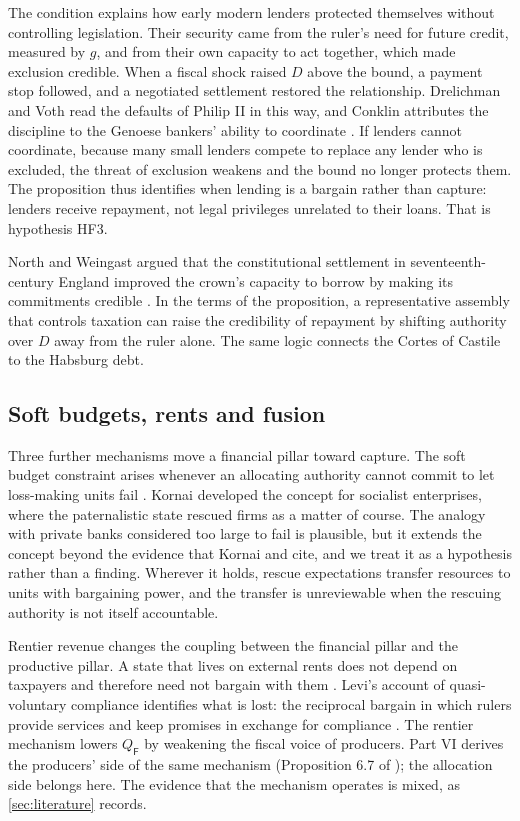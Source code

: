 \documentclass[11pt,letterpaper]{article}
\theoremstyle{definition}
\theoremstyle{remark}
\newcommand{\pF}{\mathsf{F}}
\begin{document}
The condition explains how early modern lenders protected themselves without controlling legislation. Their security came from the ruler's need for future credit, measured by $g$, and from their own capacity to act together, which made exclusion credible. When a fiscal shock raised $D$ above the bound, a payment stop followed, and a negotiated settlement restored the relationship. Drelichman and Voth read the defaults of Philip II in this way, and Conklin attributes the discipline to the Genoese bankers' ability to coordinate \citep{drelichman2011,conklin1998}. If lenders cannot coordinate, because many small lenders compete to replace any lender who is excluded, the threat of exclusion weakens and the bound no longer protects them. The proposition thus identifies when lending is a bargain rather than capture: lenders receive repayment, not legal privileges unrelated to their loans. That is hypothesis HF3.

North and Weingast argued that the constitutional settlement in seventeenth-century England improved the crown's capacity to borrow by making its commitments credible \citep{northweingast1989}. In the terms of the proposition, a representative assembly that controls taxation can raise the credibility of repayment by shifting authority over $D$ away from the ruler alone. The same logic connects the Cortes of Castile to the Habsburg debt.

\subsection{Soft budgets, rents and fusion}

Three further mechanisms move a financial pillar toward capture. The soft budget constraint arises whenever an allocating authority cannot commit to let loss-making units fail \citep{kornai1986}. Kornai developed the concept for socialist enterprises, where the paternalistic state rescued firms as a matter of course. The analogy with private banks considered too large to fail is plausible, but it extends the concept beyond the evidence that Kornai and \citet{largo2026hbs} cite, and we treat it as a hypothesis rather than a finding. Wherever it holds, rescue expectations transfer resources to units with bargaining power, and the transfer is unreviewable when the rescuing authority is not itself accountable.

Rentier revenue changes the coupling between the financial pillar and the productive pillar. A state that lives on external rents does not depend on taxpayers and therefore need not bargain with them \citep{mahdavy1970,beblawiluciani1987}. Levi's account of quasi-voluntary compliance identifies what is lost: the reciprocal bargain in which rulers provide services and keep promises in exchange for compliance \citep{levi1988}. The rentier mechanism lowers $Q_{\pF}$ by weakening the fiscal voice of producers. Part VI derives the producers' side of the same mechanism (Proposition 6.7 of \citealt{long2026productive}); the allocation side belongs here. The evidence that the mechanism operates is mixed, as \cref{sec:literature} records.
\end{document}
